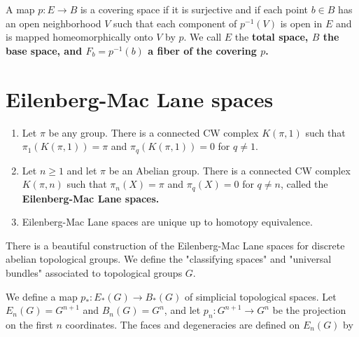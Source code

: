 A map $p: E \longrightarrow B$ is a covering space if it is surjective and if each point $b \in B$ has an open neighborhood $V$ such that each component of $p^{-1}(V)$ is open in $E$ and is mapped homeomorphically onto $V$ by $p$. We call $E$ the \bf{total space}, $B$ the \bf{base space}, and $F_b=p^{-1}(b)$ a \bf{fiber of the covering} $p$.





\section{Eilenberg-Mac Lane spaces}

\begin{theo}[Construction]
    \begin{enumerate}
        \item Let $\pi$ be any group. There is a connected CW complex $K(\pi, 1)$ such that $\pi_1(K(\pi, 1))=\pi$ and $\pi_q(K(\pi, 1))=0$ for $q \neq 1$.
        
        \item Let $n \geq 1$ and let $\pi$ be an Abelian group. There is a connected CW complex $K(\pi, n)$ such that $\pi_n(X)=\pi$ and $\pi_q(X)=0$ for $q \neq n$, called the \bf{Eilenberg-Mac Lane spaces}.
        \item Eilenberg-Mac Lane spaces are unique up to homotopy equivalence.
    \end{enumerate}
\end{theo}

There is a beautiful construction of the Eilenberg-Mac Lane spaces for discrete abelian topological groups. We define the "classifying spaces" and "universal bundles" associated to topological groups $G$.


We define a map $p_*: E_*(G) \longrightarrow B_*(G)$ of simplicial topological spaces. Let $E_n(G)=G^{n+1}$ and $B_n(G)=G^n$, and let $p_n: G^{n+1} \longrightarrow G^n$ be the projection on the first $n$ coordinates. The faces and degeneracies are defined on $E_n(G)$ by

